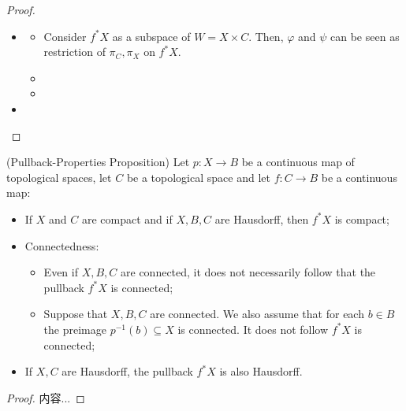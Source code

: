 \documentclass[Total.tex]{subfiles}
\begin{document}
				\begin{proof}
					\begin{itemize}
						\item 
						\begin{itemize}
							\item Consider $f^*X$ as a subspace of $W=X\times C$. Then, $\varphi$ and $\psi$ can be seen as restriction of $\pi_C,\pi_X$ on $f^*X$.
							\item 
							\item 
						\end{itemize}
						\item 
					\end{itemize}
				\end{proof}
				\begin{proposition}
					(Pullback-Properties Proposition) Let $p:X\rightarrow B$ be a continuous map of topological spaces, let $C$ be a topological space and let $f:C\rightarrow B$ be a continuous map:
					\begin{itemize}
						\item If $X$ and $C$ are compact and if $X,B,C$ are Hausdorff, then $f^*X$ is compact;
						\item Connectedness: \begin{itemize}
							\item Even if $X,B,C$ are connected, it does not necessarily follow that the pullback $f^*X$ is connected;
							\item Suppose that $X,B,C$ are connected. We also assume that for each $b\in B$ the preimage $p^{-1}(b)\subseteq X$ is connected. It does not follow $f^*X$ is connected;
						\end{itemize}
						\item If $X,C$ are Hausdorff, the pullback $f^*X$ is also Hausdorff.
					\end{itemize}
				\end{proposition}
				\begin{proof}
					内容...
				\end{proof}
\end{document}
